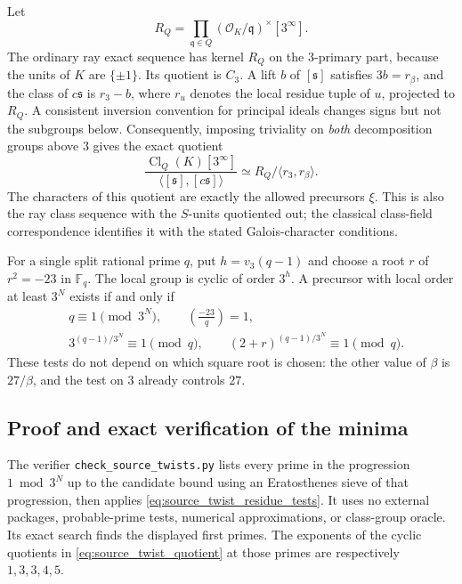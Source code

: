Let
\[
 R_Q=\prod_{\mathfrak q\in Q}
       (\mathcal O_K/\mathfrak q)^\times[3^\infty].
\]
The ordinary ray exact sequence has kernel $R_Q$ on the $3$-primary
part, because the units of $K$ are $\{\pm1\}$.  Its quotient is $C_3$.
A lift $b$ of $[\mathfrak s]$ satisfies $3b=r_\beta$, and the class
of $c\mathfrak s$ is $r_3-b$, where $r_u$ denotes the local residue
tuple of $u$, projected to $R_Q$.  A consistent inversion convention
for principal ideals changes signs but not the subgroups below.
Consequently, imposing triviality on \emph{both} decomposition groups
above $3$ gives the exact quotient
\begin{equation}\label{eq:source_twist_quotient}
 \frac{\operatorname{Cl}_Q(K)[3^\infty]}
 {\langle[\mathfrak s],[c\mathfrak s]\rangle}
       \simeq R_Q/\langle r_3,r_\beta\rangle.
\end{equation}
The characters of this quotient are exactly the allowed precursors
$\xi$.  This is also the ray class sequence with the $S$-units
quotiented out; the classical class-field correspondence identifies it
with the stated Galois-character conditions.\cite{milneCFT}

For a single split rational prime $q$, put $h=v_3(q-1)$ and choose a
root $r$ of $r^2=-23$ in $\mathbb F_q$.  The local group is cyclic
of order $3^h$.  A precursor with local order at least $3^N$ exists
if and only if
\begin{equation}\label{eq:source_twist_residue_tests}
 \begin{split}
  &q\equiv1\pmod{3^N},\qquad \left(\frac{-23}{q}\right)=1,\\
  &3^{(q-1)/3^N}\equiv1\pmod q,
       \qquad(2+r)^{(q-1)/3^N}\equiv1\pmod q.
 \end{split}
\end{equation}
These tests do not depend on which square root is chosen: the other
value of $\beta$ is $27/\beta$, and the test on $3$ already controls
$27$.

\subsection{Proof and exact verification of the minima}

The verifier \texttt{check\_source\_twists.py} lists every prime in
the progression $1\bmod3^N$ up to the candidate bound using an
Eratosthenes sieve of that progression, then applies
\eqref{eq:source_twist_residue_tests}.  It uses no external packages,
probable-prime tests, numerical approximations, or class-group oracle.
Its exact search finds the displayed first primes.  The exponents of
the cyclic quotients in \eqref{eq:source_twist_quotient} at those primes
are respectively $1,3,3,4,5$.

